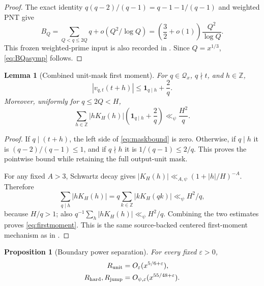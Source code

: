 \documentclass[10pt]{article}
\newtheorem{proposition}[theorem]{Proposition}
\newtheorem{lemma}[theorem]{Lemma}
\newcommand{\Z}{\mathbb Z}
\newcommand{\one}{\mathbf 1}
\newcommand{\Qx}{\mathcal Q_x}
\newcommand{\e}{\varepsilon}
\begin{document}
\begin{proof}
The exact identity $q(q-2)/(q-1)=q-1-1/(q-1)$ and weighted PNT give
\[
 B_Q=\sum_{Q<q\leq2Q}q+o(Q^2/\log Q)
    =\left(\frac32+o(1)\right)\frac{Q^2}{\log Q}.
\]
This frozen weighted-prime input is also recorded in \cite{vtop}.
Since $Q=x^{1/3}$, \eqref{eq:BQasymp} follows.
\end{proof}

\begin{lemma}[Combined unit-mask first moment]\label{lem:firstmoment}
For $q\in\Qx$, $q\nmid t$, and $h\in\Z$,
\begin{equation}
 |v_{q,t}(t+h)|\leq\one_{q\mid h}+\frac2q.                    \label{eq:maskbound}
\end{equation}
Moreover, uniformly for $q\leq2Q<H$,
\begin{equation}
 \sum_{h\in\Z}|hK_H(h)|\left(\one_{q\mid h}+\frac2q\right)
 \ll_{\psi}\frac{H^2}{q}.                                  \label{eq:firstmoment}
\end{equation}
\end{lemma}

\begin{proof}
If $q\mid(t+h)$, the left side of \eqref{eq:maskbound} is zero.  Otherwise,
if $q\mid h$ it is $(q-2)/(q-1)\leq1$, and if $q\nmid h$ it is
$1/(q-1)\leq2/q$.  This proves the pointwise bound while retaining the full
output-unit mask.

For any fixed $A>3$, Schwartz decay gives
$|K_H(h)|\ll_{A,\psi}(1+|h|/H)^{-A}$.  Therefore
\[
 \sum_{q\mid h}|hK_H(h)|
 =q\sum_{k\in\Z}|kK_H(qk)|\ll_\psi H^2/q,
\]
because $H/q>1$; also
$q^{-1}\sum_h|hK_H(h)|\ll_\psi H^2/q$.  Combining the two estimates proves
\eqref{eq:firstmoment}.  This is the same source-backed centered first-moment
mechanism as in \cite{v43}.
\end{proof}

\begin{proposition}[Boundary power separation]\label{prop:remainders}
For every fixed $\e>0$,
\begin{align}
 R_{\rm unit}&=O_\e(x^{5/6+\e}),                              \label{eq:unitbound}\\
 R_{\rm hard},R_{\rm jump}&=O_{\psi,\e}(x^{55/48+\e}).      \label{eq:boundarybound}
\end{align}
\end{proposition}
\end{document}
